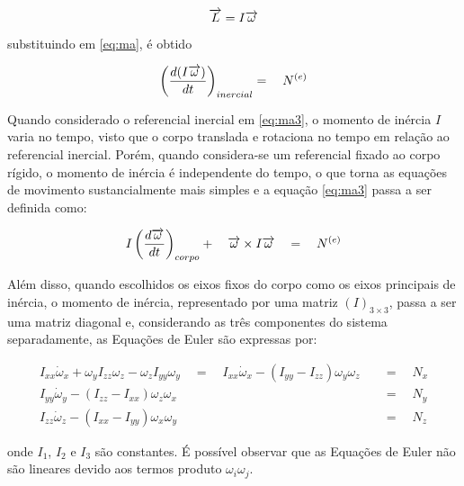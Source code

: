\documentclass[a4paper, 12pt]{article}
\begin{document}
\begin{equation}
\centering
 \overrightarrow { L } =I\overrightarrow { \omega } 
\label{eq:ma2}
\end{equation}

\noindent substituindo em \ref{eq:ma}, é obtido 

\begin{equation}
\centering
{ \left( \frac { d(I\overrightarrow { \omega  } ) }{ dt }  \right)  }_{ inercial }=\quad { N }^{ (e) }
\label{eq:ma3}
\end{equation}

Quando considerado o referencial inercial em \ref{eq:ma3}, o momento de inércia $I$ varia no tempo, visto que o corpo translada e rotaciona no tempo em relação ao referencial inercial. Porém, quando considera-se um referencial fixado ao corpo rígido, o momento de inércia é independente do tempo, o que torna as equações de movimento sustancialmente mais simples e a equação \ref{eq:ma3} passa a ser definida como:

\begin{equation}
\centering
{ I\left( \frac { d\overrightarrow { \omega  }  }{ dt }  \right)  }_{ corpo }+\quad \overrightarrow { \omega  } \times I\overrightarrow { \omega  } \quad =\quad { N }^{ (e) }
\label{eq:ma4}
\end{equation}

Além disso, quando escolhidos os eixos fixos do corpo como os eixos principais de inércia, o momento de inércia, representado por uma matriz $(I)_{3\times3}$, passa a ser uma matriz diagonal e, considerando as três componentes do sistema separadamente, as Equações de Euler são expressas por:


\begin{equation}
\begin{aligned}
{ I }_{ xx }{ \dot { \omega  }  }_{ x }+{ \omega  }_{ y }I_{ zz }\omega _{ z }-\omega _{ z }I_{ yy }\omega _{ y }\quad =\quad { I }_{ xx }{ \dot { \omega  }  }_{ x } - (I_{ yy } - I_{ zz }){ \omega  }_{ y }{ \omega  }_{ z }\quad &=\quad N_{ x } \\
{ I }_{ yy }{ \dot { \omega  }  }_{ y } - (I_{ zz } - I_{ xx }){ \omega  }_{ z }{ \omega  }_{ x }\quad &=\quad N_{ y }\\
{ I }_{ zz }{ \dot { \omega  }  }_{ z } - (I_{ xx } - I_{ yy }){ \omega  }_{ x }{ \omega  }_{ y }\quad &=\quad N_{ z }
\end{aligned}
\label{eq:eulers}
\end{equation}

\noindent onde $I_1$, $I_2$ e $I_3$ são constantes. É possível observar que as Equações de Euler não são lineares devido aos termos produto $\omega_i\omega_j$. 
\end{document}
